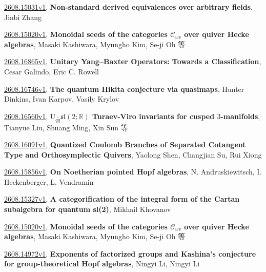 \documentclass[9pt, a4paper]{article}
\theoremstyle{plain}
\theoremstyle{definition}
\theoremstyle{remark}
\newcommand{\arxiv}[3]{\href{https://arxiv.org/abs/#1}{#1}, \textbf{\textcolor{arxivblue}{#2}}, #3}
\begin{document}
\arxiv{2608.15031v1}{Non-standard derived equivalences over arbitrary fields}{Jinbi Zhang}

\arxiv{2608.15020v1}{Monoidal seeds of the categories $\mathcal{C}_{wv}$ over quiver Hecke algebras}{Masaki Kashiwara, Myungho Kim, Se-ji Oh 等}

\arxiv{2608.16865v1}{Unitary Yang--Baxter Operators: Towards a Classification}{Cesar Galindo, Eric C. Rowell}

\arxiv{2608.16746v1}{The quantum Hikita conjecture via quasimaps}{Hunter Dinkins, Ivan Karpov, Vasily Krylov}

\arxiv{2608.16560v1}{$\mathrm {U}_{q\tilde q}\mathfrak{sl}(2;\mathbb R)$ Turaev-Viro invariants for cusped $3$-manifolds}{Tianyue Liu, Shuang Ming, Xin Sun 等}

\arxiv{2608.16091v1}{Quantized Coulomb Branches of Separated Cotangent Type and Orthosymplectic Quivers}{Yaolong Shen, Changjian Su, Rui Xiong}

\arxiv{2608.15856v1}{On Noetherian pointed Hopf algebras}{N. Andruskiewitsch, I. Heckenberger, L. Vendramin}

\arxiv{2608.15327v1}{A categorification of the integral form of the Cartan subalgebra for quantum sl(2)}{Mikhail Khovanov}

\arxiv{2608.15020v1}{Monoidal seeds of the categories $\mathcal{C}_{wv}$ over quiver Hecke algebras}{Masaki Kashiwara, Myungho Kim, Se-ji Oh 等}

\arxiv{2608.14972v1}{Exponents of factorized groups and Kashina's conjecture for group-theoretical Hopf algebras}{Ningyi Li, Ningyi Li}

\end{document}
